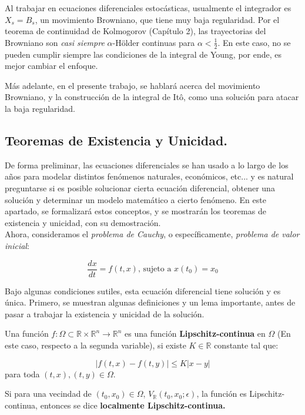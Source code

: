 Al trabajar en ecuaciones diferenciales estocásticas, usualmente el integrador es $X_s = B_s$, un movimiento Browniano, que tiene muy baja regularidad. Por el teorema de continuidad de Kolmogorov (Capítulo 2), las trayectorias del Browniano son \textit{casi siempre} $\alpha$-Hölder continuas para $\alpha < \frac{1}{2}$. En este caso, no se pueden cumplir siempre las condiciones de la integral de Young, por ende, es mejor cambiar el enfoque.

Más adelante, en el presente trabajo, se hablará acerca del movimiento Browniano, y la construcción de la integral de Itô, como una solución para atacar la baja regularidad.






\subsection{Teoremas de Existencia y Unicidad.}

De forma preliminar, las ecuaciones diferenciales se han usado a lo largo de los años para modelar distintos fenómenos naturales, económicos, etc... y es natural preguntarse si es posible solucionar cierta ecuación diferencial, obtener una solución y determinar un modelo matemático a cierto fenómeno. En este apartado, se formalizará estos conceptos, y se mostrarán los teoremas de existencia y unicidad, con su demostración. \\


Ahora, consideramos el \textit{problema de Cauchy}, o específicamente, \textit{problema de valor inicial}:

\[
	\frac{dx}{dt} = f(t, x) \text{, sujeto a } x(t_0) = x_0
\]

Bajo algunas condiciones sutiles, esta ecuación diferencial tiene solución y es única. Primero, se muestran algunas definiciones y un lema importante, antes de pasar a trabajar la existencia y unicidad de la solución.

\begin{boxDef}
	Una función $f: \Omega \subset \mathbb{R} \times \mathbb{R}^n \rightarrow \mathbb{R}^n$ es una función \textbf{Lipschitz-continua} en $\Omega$ (En este caso, respecto a la segunda variable), si existe $K \in \mathbb{R}$ constante tal que:

	\[
		\lvert f(t,x) - f(t,y) \rvert \leq K \lvert x - y \rvert
	\]
	para toda $(t,x), (t,y) \in \Omega$.

	Si para una vecindad de $(t_0, x_0) \in \Omega$, $V_{\mathbb{R}}(t_0, x_0; \epsilon)$, la función es Lipschitz-continua, entonces se dice \textbf{localmente Lipschitz-continua.}

\end{boxDef}

